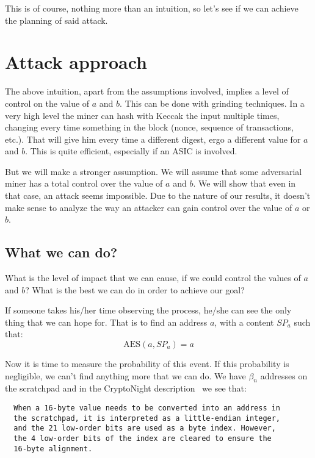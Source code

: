This is of course, nothing more than an intuition, so let's see if we can achieve the planning of said attack.
\section{Attack approach}
The above intuition, apart from the assumptions involved, implies a level of control on the value of $a$ and $b$. This can be done with grinding techniques. In a very high level the miner can hash with Keccak the input multiple times, changing every time something in the block (nonce, sequence of transactions, etc.). That will give him every time a different digest, ergo a different value for $a$ and $b$. This is quite efficient, especially if an ASIC is involved.

But we will make a stronger assumption. We will assume that some adversarial miner has a total control over the value of $a$ and $b$. We will show that even in that case, an attack seems impossible. Due to the nature of our results, it doesn't make sense to analyze the way an attacker can gain control over the value of $a$ or $b$.

\subsection{What we can do?}
What is the level of impact that we can cause, if we could control the values of $a$ and $b$? What is the best we can do in order to achieve our goal?

If someone takes his/her time observing the process, he/she can see the only thing that we can hope for. That is to find an address $a$, with a content $SP_a$ such that:
\begin{equation} \nonumber
  \mbox{AES}(a,SP_a) = a
\end{equation}

Now it is time to measure the probability of this event. If this probability is negligible, we can't find anything more that we can do. We have $\beta_n$ addresses on the scratchpad and in the CryptoNight description~\cite{cryptonight} we see that:
\begin{verbatim}
  When a 16-byte value needs to be converted into an address in
  the scratchpad, it is interpreted as a little-endian integer,
  and the 21 low-order bits are used as a byte index. However,
  the 4 low-order bits of the index are cleared to ensure the
  16-byte alignment.
\end{verbatim}

